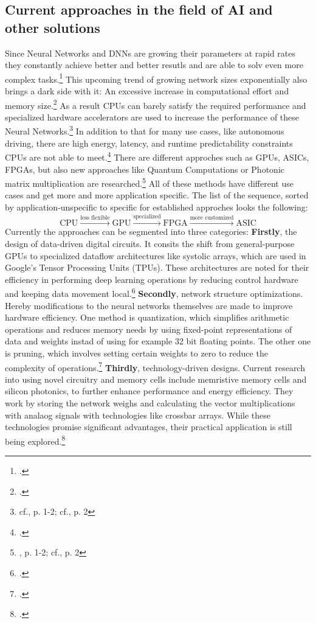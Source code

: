 \subsection{Current approaches in the field of AI and other solutions}
Since Neural Networks and \ac{DNN}s are growing their parameters at rapid rates they constantly achieve better and better resutls and are able to solv even more complex tasks.\footcite[cf.][1]{baischerLearningHardwareTutorial2021}
This upcoming trend of growing network sizes exponentially also brings a dark side with it: An excessive increase in computational effort and memory size.\footcite[cf.][1-2]{baischerLearningHardwareTutorial2021}
As a result \ac{CPU}s can barely satisfy the required performance and specialized hardware accelerators are used to increase the performance of these Neural Networks.\footnote{cf.\cite{zhouPhotonicMatrixMultiplication2022}, p. 1-2; cf.\cite{baischerLearningHardwareTutorial2021}, p. 2}
In addition to that for many use cases, like autonomous driving, there are high energy, latency, and runtime predictability constraints \ac{CPU}s are not able to meet.\footcite[cf.][2692]{ahmadOptimizingHardwareAccelerated2020}
There are different approches such as \ac{GPU}s, \ac{ASIC}s, \ac{FPGA}s, but also new approaches like Quantum Computations or Photonic matrix multiplication are researched.\footnote{\cite{zhouPhotonicMatrixMultiplication2022}, p. 1-2; cf.\cite{baischerLearningHardwareTutorial2021}, p. 2}
All of these methods have different use cases and get more and more application specific. The list of the sequence, sorted by application-unspecific to specific for established approches looks the following:
\[
\text{CPU} \xrightarrow{\text{less flexible}} \text{GPU} \xrightarrow{\text{specialized}} \text{FPGA} \xrightarrow{\text{more customized}} \text{ASIC}
\]
Currently the approaches can be segmented into three categories:
\textbf{Firstly}, the design of data-driven digital circuits.
It consits the shift from general-purpose GPUs to specialized dataflow architectures like systolic arrays, which are used in Google’s Tensor Processing Units (TPUs).
These architectures are noted for their efficiency in performing deep learning operations by reducing control hardware and keeping data movement local.\footcite[cf.][3883]{lehnertMostResourceEfficient2023}
\textbf{Secondly}, network structure optimizations. 
Hereby modifications to the neural networks themselves are made to improve hardware efficiency.
One method is quantization, which simplifies arithmetic operations and reduces memory needs by using fixed-point representations of data and weights instad of using for example 32 bit floating points.
The other one is pruning, which involves setting certain weights to zero to reduce the complexity of operations.\footcite[cf.][3883]{lehnertMostResourceEfficient2023}
\textbf{Thirdly}, technology-driven designs.
Current research into using novel circuitry and memory cells include memristive memory cells and silicon photonics, to further enhance performance and energy efficiency.
They work by storing the network weighs and calculating the vector multiplications with analaog signals with technologies like crossbar arrays.
While these technologies promise significant advantages, their practical application is still being explored.\footcite[cf.][3883]{lehnertMostResourceEfficient2023}
